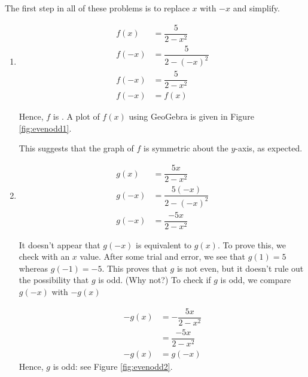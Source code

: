 {
The first step in all of these problems is to replace $x$ with $-x$ and simplify.

\begin{enumerate}

\item  \begin{align*}
f(x) & =  \dfrac{5}{2 - x^2}  \\[3pt] 
f(-x) & =  \dfrac{5}{2 - (-x)^2}  \\[3pt]  
f(-x) & =  \dfrac{5}{2 - x^2} \\[3pt]  
f(-x) & =  f(x)
\end{align*}

Hence, $f$ is .  A plot of $f(x)$ using GeoGebra is given in Figure \ref{fig:evenodd1}.



This suggests that the graph of $f$ is symmetric about the $y$-axis, as expected.


\item \begin{align*}
g(x) & =  \dfrac{5x}{2 - x^2}  \\[3pt] 
g(-x) & =  \dfrac{5(-x)}{2 - (-x)^2}  \\[3pt]  
g(-x) & =  \dfrac{-5x}{2 - x^2} 
\end{align*}

It doesn't appear that $g(-x)$ is equivalent to $g(x)$.  To prove this, we check with an $x$ value.  After some trial and error, we see that $g(1) = 5$ whereas $g(-1) = -5$.  This proves that $g$ is not even, but it doesn't rule out the possibility that $g$ is odd. (Why not?)  To check if $g$ is odd, we compare $g(-x)$ with $-g(x)$


\begin{align*}
- g(x) & =  - \dfrac{5x}{2 - x^2}  \\[3pt] 
& =   \dfrac{-5x}{2 - x^2} \\[3pt]  
-g(x) & =  g(-x)
\end{align*}
Hence, $g$ is odd: see Figure \ref{fig:evenodd2}.



\end{enumerate}}
